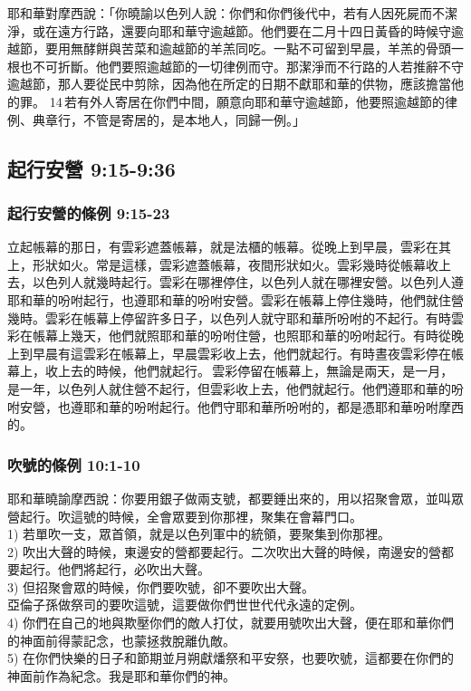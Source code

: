耶和華對摩西說：「你曉諭以色列人說：你們和你們後代中，若有人因死屍而不潔淨，或在遠方行路，還要向耶和華守逾越節。他們要在二月十四日黃昏的時候守逾越節，要用無酵餅與苦菜和逾越節的羊羔同吃。一點不可留到早晨，羊羔的骨頭一根也不可折斷。他們要照逾越節的一切律例而守。那潔淨而不行路的人若推辭不守逾越節，那人要從民中剪除，因為他在所定的日期不獻耶和華的供物，應該擔當他的罪。 14 若有外人寄居在你們中間，願意向耶和華守逾越節，他要照逾越節的律例、典章行，不管是寄居的，是本地人，同歸一例。」

\subsection{起行安營 9:15-9:36}
\subsubsection{起行安營的條例 9:15-23}
\noindent
立起帳幕的那日，有雲彩遮蓋帳幕，就是法櫃的帳幕。從晚上到早晨，雲彩在其上，形狀如火。常是這樣，雲彩遮蓋帳幕，夜間形狀如火。雲彩幾時從帳幕收上去，以色列人就幾時起行。雲彩在哪裡停住，以色列人就在哪裡安營。以色列人遵耶和華的吩咐起行，也遵耶和華的吩咐安營。雲彩在帳幕上停住幾時，他們就住營幾時。雲彩在帳幕上停留許多日子，以色列人就守耶和華所吩咐的不起行。有時雲彩在帳幕上幾天，他們就照耶和華的吩咐住營，也照耶和華的吩咐起行。有時從晚上到早晨有這雲彩在帳幕上，早晨雲彩收上去，他們就起行。有時晝夜雲彩停在帳幕上，收上去的時候，他們就起行。 雲彩停留在帳幕上，無論是兩天，是一月，是一年，以色列人就住營不起行，但雲彩收上去，他們就起行。他們遵耶和華的吩咐安營，也遵耶和華的吩咐起行。他們守耶和華所吩咐的，都是憑耶和華吩咐摩西的。

\subsubsection{吹號的條例 10:1-10}
\noindent
耶和華曉諭摩西說：你要用銀子做兩支號，都要錘出來的，用以招聚會眾，並叫眾營起行。吹這號的時候，全會眾要到你那裡，聚集在會幕門口。\\
1) 若單吹一支，眾首領，就是以色列軍中的統領，要聚集到你那裡。\\
2) 吹出大聲的時候，東邊安的營都要起行。二次吹出大聲的時候，南邊安的營都要起行。他們將起行，必吹出大聲。\\
3) 但招聚會眾的時候，你們要吹號，卻不要吹出大聲。\\
亞倫子孫做祭司的要吹這號，這要做你們世世代代永遠的定例。\\
4) 你們在自己的地與欺壓你們的敵人打仗，就要用號吹出大聲，便在耶和華你們的神面前得蒙記念，也蒙拯救脫離仇敵。\\
5) 在你們快樂的日子和節期並月朔獻燔祭和平安祭，也要吹號，這都要在你們的神面前作為紀念。我是耶和華你們的神。 

